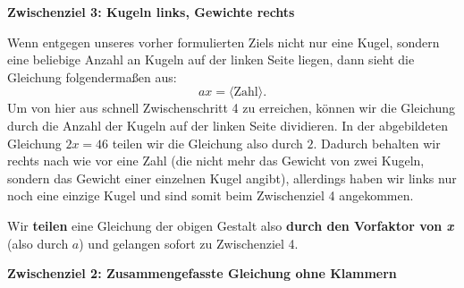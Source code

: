 \documentclass[../../main.tex]{subfiles}
\begin{document}
\textbf{Zwischenziel 3: Kugeln links, Gewichte rechts}


Wenn entgegen unseres vorher formulierten Ziels nicht nur eine Kugel, sondern eine beliebige Anzahl an Kugeln auf der linken Seite liegen, dann sieht die Gleichung folgendermaßen aus:
\[ax=\langle \text{Zahl} \rangle.\]
Um von hier aus schnell Zwischenschritt 4 zu erreichen, können wir die Gleichung durch die Anzahl der Kugeln auf der linken Seite dividieren. In der abgebildeten Gleichung $2x=46$ teilen wir die Gleichung also durch $2$. Dadurch behalten wir rechts nach wie vor eine Zahl (die nicht mehr das Gewicht von zwei Kugeln, sondern das Gewicht einer einzelnen Kugel angibt), allerdings haben wir links nur noch eine einzige Kugel und sind somit beim Zwischenziel 4 angekommen.

Wir \textbf{teilen} eine Gleichung der obigen Gestalt also \textbf{durch den Vorfaktor von \emph{x}} (also durch $a$) und gelangen sofort zu Zwischenziel 4.

\newpage
\textbf{Zwischenziel 2: Zusammengefasste Gleichung ohne Klammern}

\end{document}

